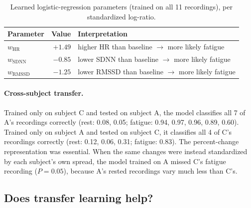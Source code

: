 \documentclass[11pt]{article}
\newcommand{\rowband}{\rowcolors{2}{bblight}{white}}
\begin{document}
\begin{table}[h]
\centering
\caption{Learned logistic-regression parameters (trained on all 11 recordings), per standardized log-ratio.}
\label{tab:weights}
\rowband\begin{tabular}{lrl}
\toprule
Parameter & Value & Interpretation \\
\midrule
$w_{\mathrm{HR}}$    & $+1.49$ & higher HR than baseline $\rightarrow$ more likely fatigue \\
$w_{\mathrm{SDNN}}$  & $-0.85$ & lower SDNN than baseline $\rightarrow$ more likely fatigue \\
$w_{\mathrm{RMSSD}}$ & $-1.25$ & lower RMSSD than baseline $\rightarrow$ more likely fatigue \\
\bottomrule
\end{tabular}
\end{table}

\paragraph{Cross-subject transfer.}
Trained only on subject C and tested on subject A, the model classifies all 7 of A's recordings correctly
(rest: 0.08, 0.05; fatigue: 0.94, 0.97, 0.96, 0.89, 0.60). Trained only on subject A and tested on subject C,
it classifies all 4 of C's recordings correctly (rest: 0.12, 0.06, 0.31; fatigue: 0.83). The percent-change
representation was essential. When the same changes were instead standardized by each subject's own spread,
the model trained on A missed C's fatigue recording ($P=0.05$), because A's rested recordings vary much less
than C's.

\subsection{Does transfer learning help?}
\label{sec:modelb_res}
\end{document}
